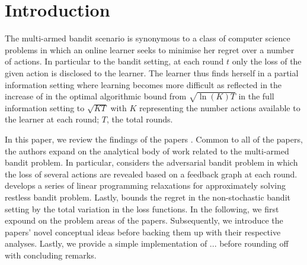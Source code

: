 \section{Introduction}

The multi-armed bandit scenario is synonymous to a class of computer science problems in which an online learner seeks to minimise her regret over a number of actions. In particular to the bandit setting, at each round $t$ only the loss of the given action is disclosed to the learner. The learner thus finds herself in a partial information setting where learning becomes more difficult as reflected in the increase of in the optimal algorithmic bound from $\sqrt{\ln(K)T}$ in the full information setting to $\sqrt{KT}$ with $K$ representing the number actions available to the learner at each round; $T$, the total rounds. 

In this paper, we review the findings of the papers \citep{alon, hazan, bertsimas}. Common to all of the papers, the authors expand on the analytical body of work related to the multi-armed bandit problem. In particular, \citep{alon} considers the adversarial bandit problem in which the loss of several actions are revealed based on a feedback graph at each round. \citep{hazan} develops a series of linear programming relaxations for approximately solving restless bandit problem. Lastly, \citep{bertsimas} bounds the regret in the non-stochastic bandit setting by the total variation in the loss functions. In the following, we first expound on the problem areas of the papers. Subsequently, we introduce the papers' novel conceptual ideas before backing them up with their respective analyses. Lastly, we provide a simple implementation of ... before rounding off with concluding remarks.